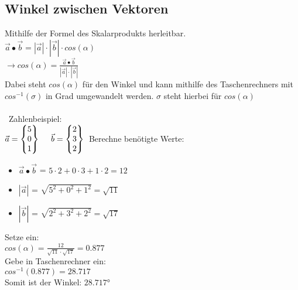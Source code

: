 \subsection{Winkel zwischen Vektoren}
\label{sec:winkel_vektoren}
Mithilfe der Formel des Skalarprodukts herleitbar. \\
$\vec{a} \bullet \vec{b} = |\vec{a}| \cdot |\vec{b}| \cdot cos(\alpha)$ \\
$\rightarrow cos(\alpha) = \frac{\vec{a}\bullet \vec{b}}{|\vec{a}|\cdot |\vec{b}|}$ \\
Dabei steht $cos(\alpha)$ für den Winkel und kann mithilfe des Taschenrechners mit $cos^{-1}(\sigma)$ in Grad umgewandelt werden. 
$\sigma$ steht hierbei für $cos(\alpha)$ \\\\
\
Zahlenbeispiel: \\
$
\vec{a} = 
\begin{Bmatrix}
    5 \\ 0 \\ 1
\end{Bmatrix} 
\ \ \ \
\vec{b} = 
\begin{Bmatrix}
    2 \\ 3 \\ 2
\end{Bmatrix} \\
$
Berechne benötigte Werte:
\begin{itemize}
    \item $\vec{a} \bullet \vec{b}$ = $5 \cdot 2 + 0 \cdot 3 + 1 \cdot 2 = 12$
    \item $|\vec{a}|$ = $\sqrt{5^2 + 0^2 + 1^2} = \sqrt{11}$
    \item $|\vec{b}|$ = $\sqrt{2^2 + 3^2 + 2^2} = \sqrt{17}$
\end{itemize}
Setze ein: \\
$cos(\alpha) = \frac{12}{\sqrt{11}\cdot \sqrt{17}} = 0.877$ \\
Gebe in Taschenrechner ein: \\
$cos^{-1}(0.877) = 28.717$ \\
Somit ist der Winkel: $28.717$°
